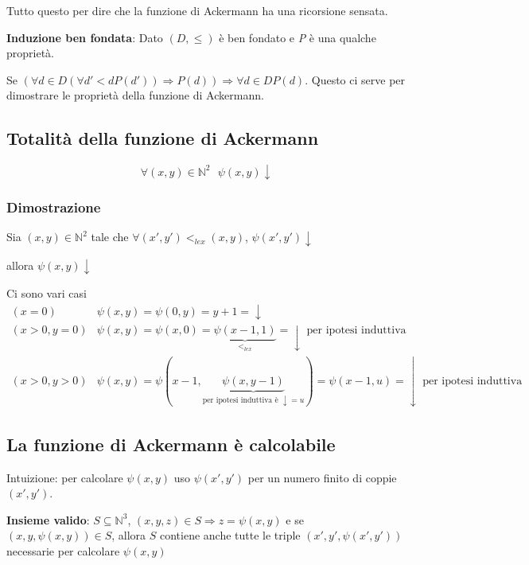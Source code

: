 Tutto questo per dire che la funzione di Ackermann ha una ricorsione sensata.

\textbf{Induzione ben fondata}: Dato $(D, \leq)$ è ben fondato e \emph{P} è una qualche proprietà. 

Se $(\forall d \in D (\forall d' < d P(d')) \Rightarrow P(d)) \Rightarrow \forall d \in D P(d)$. 
Questo ci serve per dimostrare le proprietà della funzione di Ackermann.

\subsection{Totalità della funzione di Ackermann}\label{totalituxe0-di}

$$
\forall (x,y) \in \mathbb{N}^2\:\:\: \psi(x,y)\downarrow
$$

\subsubsection{Dimostrazione}\label{dimostrazione}

Sia $(x,y) \in \mathbb{N}^2 $ tale che $\forall (x',y') <_{lex} (x,y)$, $\psi(x',y')\downarrow $

allora $\psi(x,y)\downarrow$

Ci sono vari casi
\begin{align*}
(x = 0)& \psi(x,y) = \psi(0,y) = y +1 = \downarrow \\
(x > 0, y = 0)& \psi(x,y) =\psi(x,0) = \underbrace{\psi(x-1,1)}_{<_{lex}} = \downarrow \text{ per ipotesi induttiva} \\
(x > 0, y > 0)& \psi(x,y) = \psi(x-1, \underbrace{\psi(x,y-1)}_{\text{per ipotesi induttiva è }\downarrow = u}) = \psi(x-1, u) = \downarrow \text{ per ipotesi induttiva} 
\end{align*}

\subsection{La funzione di Ackermann è calcolabile}\label{la-funzione-di-ackermann-uxe8-calcolabile}

Intuizione: per calcolare $\psi(x,y)$ uso $\psi(x',y')$ per un numero finito di coppie $ (x',y') $.

\textbf{Insieme valido}: $S \subseteq \mathbb{N}^{3}$, $(x,y,z) \in S \Rightarrow z = \psi(x,y)$ e se $(x,y,\psi(x,y)) \in S$, allora $ S $ contiene anche tutte le triple $(x',y',\psi(x',y'))$ necessarie per calcolare $\psi(x,y)$

